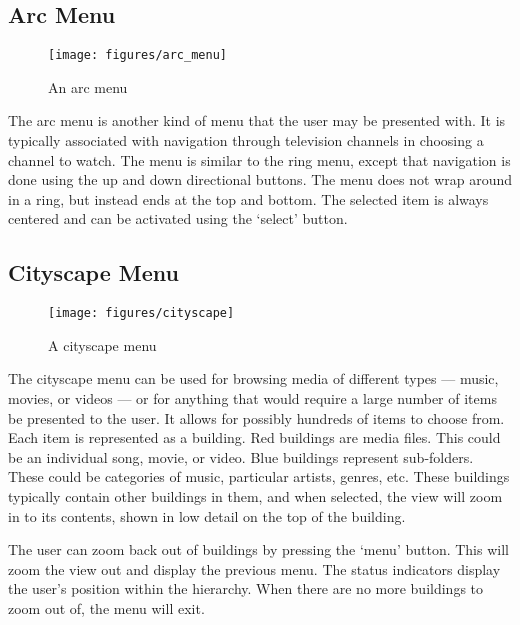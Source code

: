 \documentclass[letterpaper, titlepage, 11pt]{article}
\begin{document}
\subsection{Arc Menu}
\label{sec:arc_menu}

\begin{figure}[htb]
\centering
\texttt{[image: figures/arc\_menu]}
\caption{An arc menu\label{fig:arc}}
\end{figure}

The arc menu is another kind of menu that the user may be presented with.  It is
typically associated with navigation through television channels in choosing a
channel to watch.  The menu is similar to the ring menu, except that navigation
is done using the up and down directional buttons.  The menu does not wrap around
in a ring, but instead ends at the top and bottom.  The selected item is always
centered and can be activated using the `select' button.

\subsection{Cityscape Menu}
\label{sec:cityscape_menu}

\begin{figure}[htb]
\centering
\texttt{[image: figures/cityscape]}
\caption{A cityscape menu\label{fig:cityscape}}
\end{figure}

The cityscape menu can be used for browsing media of different types --- music,
movies, or videos --- or for anything that would require a large number of items
be presented to the user.  It allows for possibly hundreds of items to choose from.
Each item is represented as a building.  Red buildings are media files.  This
could be an individual song, movie, or video.  Blue buildings represent sub-folders.
These could be categories of music, particular artists, genres, etc.  These
buildings typically contain other buildings in them, and when selected, the view
will zoom in to its contents, shown in low detail on the top of the building.

The user can zoom back out of buildings by pressing the `menu' button.  This
will zoom the view out and display the previous menu.  The status indicators
display the user's position within the hierarchy.  When there are no more
buildings to zoom out of, the menu will exit.

\pagebreak
\end{document}
